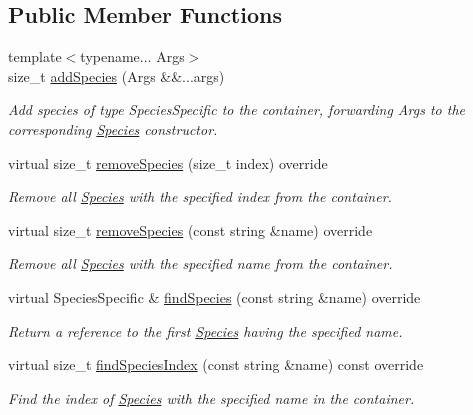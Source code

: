 \subsection*{Public Member Functions}
\begin{DoxyCompactItemize}
\item 
{\footnotesize template$<$typename... Args$>$ }\\size\+\_\+t \hyperlink{classSpeciesContainerVector_a4ac44aefad323712e75dda7f2d5d09df}{add\+Species} (Args \&\&...args)
\begin{DoxyCompactList}\small\item\em Add species of type Species\+Specific to the container, forwarding Args to the corresponding \hyperlink{classSpecies}{Species} constructor. \end{DoxyCompactList}\item 
virtual size\+\_\+t \hyperlink{classSpeciesContainerVector_af6f9bbd7215300d4f1dabc636ceeb952}{remove\+Species} (size\+\_\+t index) override
\begin{DoxyCompactList}\small\item\em Remove all \hyperlink{classSpecies}{Species} with the specified index from the container. \end{DoxyCompactList}\item 
virtual size\+\_\+t \hyperlink{classSpeciesContainerVector_a7d35f37815f070547b30666bede37dd7}{remove\+Species} (const string \&name) override
\begin{DoxyCompactList}\small\item\em Remove all \hyperlink{classSpecies}{Species} with the specified name from the container. \end{DoxyCompactList}\item 
virtual Species\+Specific \& \hyperlink{classSpeciesContainerVector_a7c8aadd03e72887a536627059e88e884}{find\+Species} (const string \&name) override
\begin{DoxyCompactList}\small\item\em Return a reference to the first \hyperlink{classSpecies}{Species} having the specified name. \end{DoxyCompactList}\item 
virtual size\+\_\+t \hyperlink{classSpeciesContainerVector_a872dadde95026895570ecfa7a6dd1c63}{find\+Species\+Index} (const string \&name) const override
\begin{DoxyCompactList}\small\item\em Find the index of \hyperlink{classSpecies}{Species} with the specified name in the container. \end{DoxyCompactList}\item 

\end{DoxyCompactItemize}
